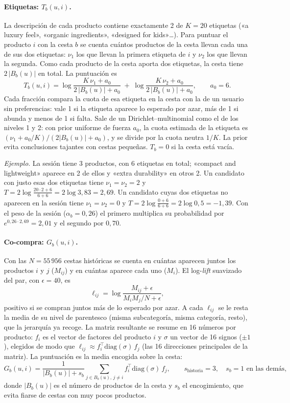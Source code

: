 \documentclass[11pt,a4paper]{article}
\begin{document}
\paragraph{Etiquetas: $T_b(u,i)$.} La descripción de cada producto contiene exactamente 2 de $K=20$
etiquetas («a luxury feel», «organic ingredients», «designed for kids»\dots). Para puntuar el producto
$i$ con la cesta $b$ se cuenta cuántos productos de la cesta llevan cada una de sus dos etiquetas:
$\nu_1$ los que llevan la primera etiqueta de $i$ y $\nu_2$ los que llevan la segunda. Como cada producto
de la cesta aporta dos etiquetas, la cesta tiene $2\,|B_b(u)|$ en total. La puntuación es
\[
T_b(u,i)=\log\frac{K\,\nu_1+a_0}{2\,|B_b(u)|+a_0}\;+\;\log\frac{K\,\nu_2+a_0}{2\,|B_b(u)|+a_0},
\qquad a_0=6 .
\]
Cada fracción compara la cuota de esa etiqueta en la cesta con la de un usuario sin preferencias: vale
1 si la etiqueta aparece lo esperado por azar, más de 1 si abunda y menos de 1 si falta. Sale de un
Dirichlet--multinomial como el de los niveles 1 y 2: con prior uniforme de fuerza $a_0$, la cuota
estimada de la etiqueta es $(\nu_1+a_0/K)/(2|B_b(u)|+a_0)$, y se divide por la cuota neutra $1/K$. La
prior evita conclusiones tajantes con cestas pequeñas. $T_b=0$ si la cesta está vacía.

\emph{Ejemplo.} La sesión tiene 3 productos, con 6 etiquetas en total; «compact and lightweight» aparece
en 2 de ellos y «extra durability» en otros 2. Un candidato con justo esas dos etiquetas tiene
$\nu_1=\nu_2=2$ y
$T=2\log\frac{20\cdot2+6}{6+6}=2\log 3{,}83=2{,}69$. Un candidato cuyas dos etiquetas no aparecen en
la sesión tiene $\nu_1=\nu_2=0$ y $T=2\log\frac{0+6}{6+6}=2\log 0{,}5=-1{,}39$. Con el peso de
la sesión ($\alpha_b=0{,}26$) el primero multiplica su probabilidad por $e^{0{,}26\cdot2{,}69}=2{,}01$ y el
segundo por $0{,}70$.

\paragraph{Co-compra: $G_b(u,i)$.} Con las $N=55\,956$ cestas históricas se cuenta en cuántas aparecen
juntos los productos $i$ y $j$ ($M_{ij}$) y en cuántas aparece cada uno ($M_i$). El log-\emph{lift}
suavizado del par, con $\epsilon=40$, es
\[
\ell_{ij}=\log\frac{M_{ij}+\epsilon}{M_iM_j/N+\epsilon},
\]
positivo si se compran juntos más de lo esperado por azar. A cada $\ell_{ij}$ se le resta la media de su
nivel de parentesco (misma subcategoría, misma categoría, resto), que la jerarquía ya recoge. La matriz
resultante se resume en 16 números por producto: $f_i$ es el vector de factores del producto $i$ y
$\sigma$ un vector de 16 signos ($\pm1$), elegidos de modo que
$\ell_{ij}\approx f_i^{\top}\mathrm{diag}(\sigma)\,f_j$ (las 16 direcciones principales de la matriz). La
puntuación es la media encogida sobre la cesta:
\[
G_b(u,i)=\frac{1}{|B_b(u)|+s_b}\sum_{j\in B_b(u),\,j\neq i} f_i^{\top}\mathrm{diag}(\sigma)\,f_j ,
\qquad s_{\text{historia}}=3,\quad s_b=1\text{ en las demás},
\]
donde $|B_b(u)|$ es el número de productos de la cesta y $s_b$ el encogimiento, que evita fiarse de
cestas con muy pocos productos.
\end{document}
